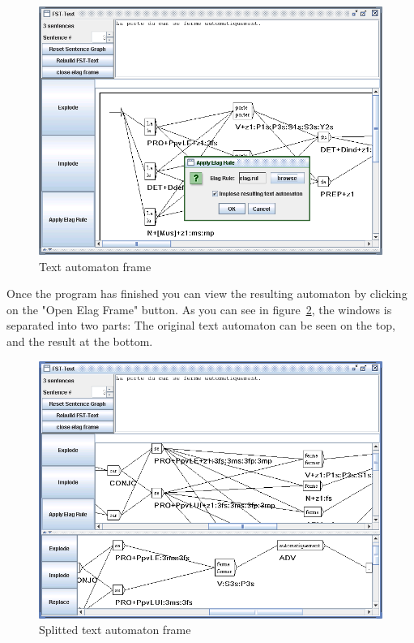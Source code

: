 \begin{figure}[!ht]
\begin{center}
\includegraphics[width=12cm]{resources/img/fig7-17.png}
\caption{Text automaton frame \label{fig-text-auto1}}
\end{center}
\end{figure}

\bigskip
\noindent Once the program has finished you can view the resulting automaton by clicking on
the "Open Elag Frame" button. As you can see in figure~\ref{fig-text-auto2},
the windows is separated into two parts: The original text automaton can be seen
on the top, and the result at the bottom.

\begin{figure}[!h]
\begin{center}
\includegraphics[width=12cm]{resources/img/fig7-18.png}
\caption{Splitted text automaton frame \label{fig-text-auto2}}
\end{center}
\end{figure}

